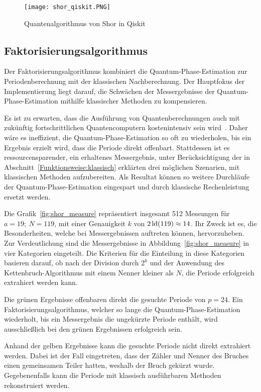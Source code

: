 \begin{figure}[H]
  \centering
  \texttt{[image: shor\_qiskit.PNG]}
  \caption{Quantenalgorithmus von Shor in Qiskit}
  \label{fig:shor_qiskit}
\end{figure}

\subsection{Faktorisierungsalgorithmus} \label{sec:Faktorisierungsalgorithmus}
Der Faktorisierungsalgorithmus kombiniert die Quantum-Phase-Estimation zur Periodenberechnung mit  
der klassischen Nachberechnung. 
Der Hauptfokus der Implementierung liegt darauf, 
die Schwächen der Messergebnisse der Quantum-Phase-Estimation mithilfe klassischer Methoden zu kompensieren.

Es ist zu erwarten, 
dass die Ausführung von Quantenberechnungen auch mit zukünftig fortschrittlichen Quantencomputern kostenintensiv sein wird~\cite{Shor_1997}.
Daher wäre es ineffizient, 
die Quantum-Phase-Estimation so oft zu wiederholen, 
bis ein Ergebnis erzielt wird, dass die Periode direkt offenbart.
Stattdessen ist es ressourcensparender, 
ein erhaltenes Messergebnis, 
unter Berücksichtigung der in Abschnitt~\ref{Funktionsweise:klassisch} erklärten drei möglichen Szenarien,
mit klassischen Methoden aufzubereiten. 
Als Resultat können so weitere Durchläufe der Quantum-Phase-Estimation eingespart und 
durch klassische Rechenleistung ersetzt werden.

\bigskip

Die Grafik~\ref{fig:shor_measure} repräsentiert insgesamt 512 Messungen für \(a=19;~N=119\), 
mit einer Genauigkeit \(k\) von \(2\operatorname{ld}(119) \approx 14 \). 
Ihr Zweck ist es, die Besonderheiten, 
welche bei Messergebnissen auftreten können, hervorzuheben.
Zur Verdeutlichung sind die Messergebnisse in Abbildung~\ref{fig:shor_measure} in vier Kategorien eingeteilt.
Die Kriterien für die Einteilung in diese Kategorien basieren darauf, 
ob nach der Division durch \(2^k\) und 
der Anwendung des Kettenbruch-Algorithmus mit einem Nenner kleiner als \(N\), 
die Periode erfolgreich extrahiert werden kann.

Die grünen Ergebnisse offenbaren direkt die gesuchte Periode von \(p = 24\).
Ein Faktorisierungsalgorithmus, welcher so lange die Quantum-Phase-Estimation wiederholt, 
bis ein Messergebnis die ungekürzte Periode enthält, 
wird ausschließlich bei den grünen Ergebnissen erfolgreich sein.

Anhand der gelben Ergebnisse kann die gesuchte Periode nicht direkt extrahiert werden.
Dabei ist der Fall eingetreten, dass der Zähler und Nenner des Bruches einen gemeinsamen Teiler hatten, 
weshalb der Bruch gekürzt wurde.
Gegebenenfalls kann die Periode mit klassisch ausführbaren Methoden rekonstruiert werden.

